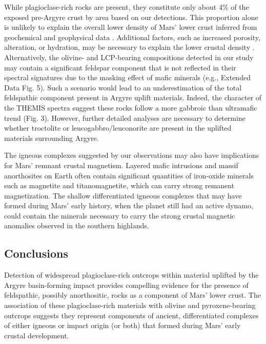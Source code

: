 \documentclass[11pt]{article}
\begin{document}
While plagioclase-rich rocks are present, they constitute only about 4\% of the exposed pre-Argyre crust by area based on our detections. This proportion alone is unlikely to explain the overall lower density of Mars' lower crust inferred from geochemical and geophysical data \citep{Baratoux2014, Goossens2017, Knapmeyer-Endrun2021, Drilleau2023, Joshi2023}. Additional factors, such as increased porosity, alteration, or hydration, may be necessary to explain the lower crustal density \citep{Ehlmann2010, Bandfield2013, Sun2015, Wordsworth2017, Goossens2017, Wieczorek2022, Carrasco2023}. Alternatively, the olivine- and LCP-bearing compositions detected in our study may contain a significant feldspar component that is not reflected in their spectral signatures due to the masking effect of mafic minerals (e.g., Extended Data Fig. 5). Such a scenario would lead to an underestimation of the total feldspathic component present in Argyre uplift materials. Indeed, the character of the THEMIS spectra suggest these rocks follow a more gabbroic than ultramafic trend (Fig. 3). However, further detailed analyses are necessary to determine whether troctolite or leucogabbro/leuconorite are present in the uplifted materials surrounding Argyre.

The igneous complexes suggested by our observations may also have implications for Mars' remnant crustal magnetism. Layered mafic intrusions and massif anorthosites on Earth often contain significant quantities of iron-oxide minerals such as magnetite and titanomagnetite, which can carry strong remanent magnetization. The shallow differentiated igneous complexes that may have formed during Mars' early history, when the planet still had an active dynamo, could contain the minerals necessary to carry the strong crustal magnetic anomalies observed in the southern highlands.

\subsection*{Conclusions}

Detection of widespread plagioclase-rich outcrops within material uplifted by the Argyre basin-forming impact provides compelling evidence for the presence of feldspathic, possibly anorthositic, rocks as a component of Mars' lower crust. The association of these plagioclase-rich materials with olivine and pyroxene-bearing outcrops suggests they represent components of ancient, differentiated complexes of either igneous or impact origin (or both) that formed during Mars' early crustal development.
\end{document}
